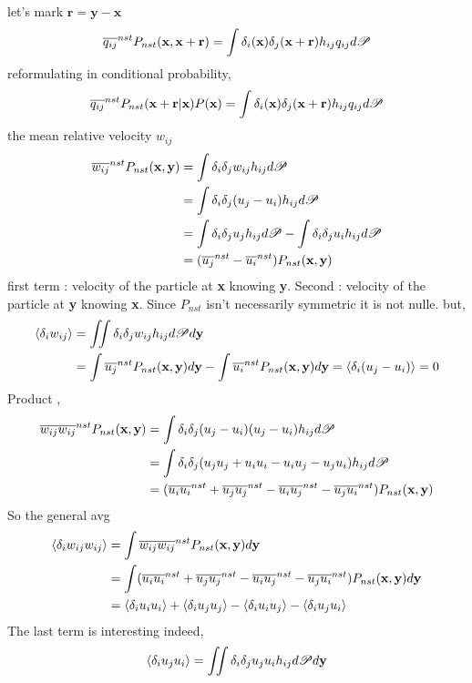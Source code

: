 let's mark $\textbf{r} = \textbf{y} - \textbf{x}$
\begin{equation*}
    \overline{q_{ij}}^{nst} P_{nst}(\textbf{x},\textbf{x}+\textbf{r})= \int\delta_i(\textbf{x})\delta_j(\textbf{x}+\textbf{r}) h_{ij}q_{ij} d\mathscr{P} 
\end{equation*}
reformulating in conditional probability, 
\begin{equation*}
    \overline{q_{ij}}^{nst} P_{nst}(\textbf{x}+\textbf{r}|\textbf{x}) P(\textbf{x})= \int\delta_i(\textbf{x})\delta_j(\textbf{x}+\textbf{r}) h_{ij}q_{ij} d\mathscr{P} 
\end{equation*}
the mean relative velocity $w_{ij}$
\begin{align*}
    \overline{w_{ij}}^{nst} P_{nst}(\textbf{x},\textbf{y}) 
    &= \int\delta_i\delta_j w_{ij}h_{ij} d\mathscr{P} \\
    &= \int\delta_i\delta_j (u_j - u_i)h_{ij} d\mathscr{P} \\
    &= \int\delta_i\delta_j u_j h_{ij} d\mathscr{P} 
    - \int\delta_i\delta_j u_i h_{ij} d\mathscr{P} \\
    &= (\overline{u_j}^{nst} - \overline{u_i}^{nst}) P_{nst}(\textbf{x},\textbf{y})
\end{align*}
first term : velocity of the particle at \textbf{x} knowing \textbf{y}.
Second :  velocity of the particle at \textbf{y} knowing \textbf{x}.
Since $P_{nst}$ isn't necessarily symmetric it is not nulle. 
but,  
\begin{align*}
    \left<\delta_i w_{ij}\right>
    &=\iint\delta_i\delta_j w_{ij}h_{ij} d\mathscr{P}d\textbf{y}\\
    &= \int \overline{u_j}^{nst} P_{nst}(\textbf{x},\textbf{y}) d\textbf{y}
    - \int \overline{u_i}^{nst} P_{nst}(\textbf{x},\textbf{y}) d\textbf{y}
    = 
    \left<\delta_i (u_j-u_i)\right>
    = 0
\end{align*}
Product , 
\begin{align*}
    \overline{w_{ij}w_{ij}}^{nst} P_{nst}(\textbf{x},\textbf{y}) 
    &= \int\delta_i\delta_j (u_j - u_i)(u_j - u_i) h_{ij} d\mathscr{P} \\
    &= \int\delta_i\delta_j (u_ju_j + u_iu_i - u_iu_j - u_ju_i) h_{ij} d\mathscr{P} \\
    &= (\overline{u_iu_i}^{nst}+ \overline{u_ju_j}^{nst} - \overline{u_iu_j}^{nst}- \overline{u_ju_i}^{nst}) P_{nst}(\textbf{x},\textbf{y})
\end{align*}
So the general avg 
\begin{align*}
    \left<\delta_i w_{ij}w_{ij}\right>
    &=\int \overline{w_{ij}w_{ij}}^{nst} P_{nst}(\textbf{x},\textbf{y}) d\textbf{y}\\
    &= \int(\overline{u_iu_i}^{nst}+ \overline{u_ju_j}^{nst} - \overline{u_iu_j}^{nst}- \overline{u_ju_i}^{nst}) P_{nst}(\textbf{x},\textbf{y})d\textbf{y}\\
    &= \left<\delta_i u_iu_i\right> 
    + \left<\delta_i u_ju_j\right>
    - \left<\delta_i u_iu_j\right>
    - \left<\delta_i u_ju_i\right>
\end{align*}
The last term is interesting indeed, 
\begin{align*}
    \left<\delta_i u_ju_i\right>
    =\iint \delta_i \delta_j u_ju_i h_{ij} d\mathscr{P} d\textbf{y}
\end{align*}

